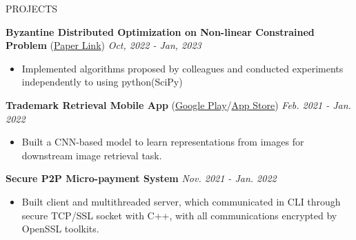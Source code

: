 \documentclass{resume} %
\begin{document}
\begin{rSection}{PROJECTS}
\vspace{-1.25em}

\item {\bf Byzantine Distributed Optimization on Non-linear Constrained Problem} (\href{https://github.com/slimon110/2022_Fault_Tolerance/blob/master/FT-Report/FT-Report.pdf}{Paper Link})  \hfill \textit{Oct, 2022 - Jan, 2023}
\begin{itemize}
    \itemsep -3pt
    \item Implemented algorithms proposed by colleagues and conducted experiments independently to using python(SciPy)
\end{itemize}


\item \textbf{Trademark Retrieval Mobile App} (\href{https://play.google.com/store/apps/details?id=meow.logoshot&hl=zh_TW&gl=TW&pli=1}{Google Play}/\href{https://apps.apple.com/tw/app/logo-shot/id1611756574}{App Store}) \hfill \textit{Feb. 2021 - Jan. 2022}
\begin{itemize}
    \itemsep -3pt
    \item  Built a CNN-based model to learn representations from images for downstream image retrieval task.
\end{itemize}

\item \textbf{Secure P2P Micro-payment System} \hfill \textit{Nov. 2021 - Jan. 2022} 
\begin{itemize}
    \itemsep -3pt
    \item Built client and multithreaded server, which communicated in CLI through secure TCP/SSL socket with C++, with all communications encrypted by OpenSSL toolkits.
\end{itemize}


\end{rSection}
\end{document}
